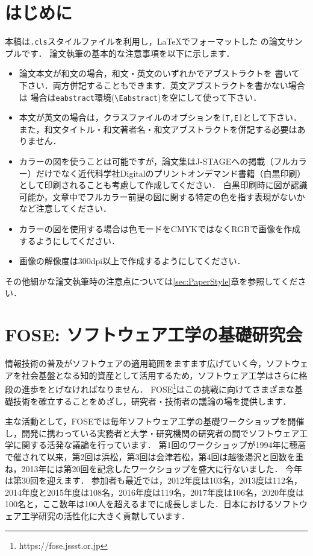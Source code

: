 \documentclass[T,J]{fose} %
\begin{document}
\section{はじめに}
本稿は{\tt \MakeLowercase{\foseabbrev}.cls}スタイルファイルを利用し，\LaTeX でフォーマットした \foseabbrev の論文サンプルです．
論文執筆の基本的な注意事項を以下に示します．
\begin{itemize}
\item 論文本文が和文の場合，和文・英文のいずれかでアブストラクトを
書いて下さい．両方併記することもできます．英文アブストラクトを書かない場合は
場合は{\tt eabstract}環境(\verb|\Eabstract|)を空にして使って下さい．
\item 本文が英文の場合は，クラスファイルのオプションを{\verb|[T,E]|}として下さい．
また，和文タイトル・和文著者名・和文アブストラクトを併記する必要はありません．
\item カラーの図を使うことは可能ですが，論文集はJ-STAGEへの掲載（フルカラー）だけでなく近代科学社Digitalのプリントオンデマンド書籍（白黒印刷）として印刷されることも考慮して作成してください．
白黒印刷時に図が認識可能か，文章中でフルカラー前提の図に関する特定の色を指す表現がないかなど注意してください．
\item カラーの図を使用する場合は色モードをCMYKではなくRGBで画像を作成するようにしてください．
\item 画像の解像度は300dpi以上で作成するようにしてください．
\end{itemize}
その他細かな論文執筆時の注意点については\ref{sec:PaperStyle}章を参照してください．


\section{FOSE: ソフトウェア工学の基礎研究会}
情報技術の普及がソフトウェアの適用範囲をますます広げていく今，ソフトウェアを社会基盤となる知的資産として活用するため，ソフトウェア工学はさらに格段の進歩をとげなければなりません．
FOSE\footnote{https://fose.jssst.or.jp}はこの挑戦に向けてさまざまな基礎技術を確立することをめざし，研究者・技術者の議論の場を提供します．

主な活動として，FOSEでは毎年ソフトウェア工学の基礎ワークショップを開催し，開発に携わっている実務者と大学・研究機関の研究者の間でソフトウェア工学に関する活発な議論を行っています．
第1回のワークショップが1994年に穂高で催されて以来，第2回は浜松，第3回は会津若松，第4回は越後湯沢と回数を重ね，2013年には第20回を記念したワークショップを盛大に行ないました．
今年は第30回を迎えます．
参加者も最近では，2012年度は103名，2013度は112名，2014年度と2015年度は108名，2016年度は119名，2017年度は106名，2020年度は100名と，ここ数年は100人を超えるまでに成長しました．日本におけるソフトウェア工学研究の活性化に大きく貢献しています．
\end{document}
